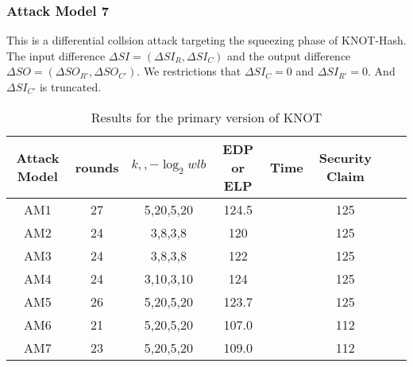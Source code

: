 \subsubsection{Attack Model 7}
This is a differential collsion attack targeting the squeezing phase of KNOT-Hash. The input difference $\Delta SI=(\Delta SI_R,\Delta SI_C)$ and the output difference $\Delta SO=(\Delta SO_{R'},\Delta SO_{C'})$. We restrictions that $\Delta SI_C=0$ and $\Delta SI_{R'}=0$. And $\Delta SI_{C'}$ is truncated. 

\begin{table}
	\caption{Results for the primary version of KNOT}\label{tab:knot}
	\centering
	\begin{tabular}{|c|c|c|c|c|c|c|c|}
		\hline
		Attack Model & rounds & $k,,-\log_2wlb$ & EDP or ELP & Time & Security Claim\\
		\hline
		AM1 & 27 & 5,20,5,20 & 124.5 & & 125 \\
		AM2 & 24 & 3,8,3,8 & 120 & & 125 \\
		AM3 & 24 & 3,8,3,8 & 122 & & 125 \\
		AM4 & 24 & 3,10,3,10 & 124 & & 125 \\
		AM5 & 26 & 5,20,5,20 & 123.7 & & 125 \\
		AM6 & 21 & 5,20,5,20 & 107.0 & & 112 \\
		AM7 & 23 & 5,20,5,20 & 109.0 & & 112 \\
		\hline
	\end{tabular}
\end{table}
